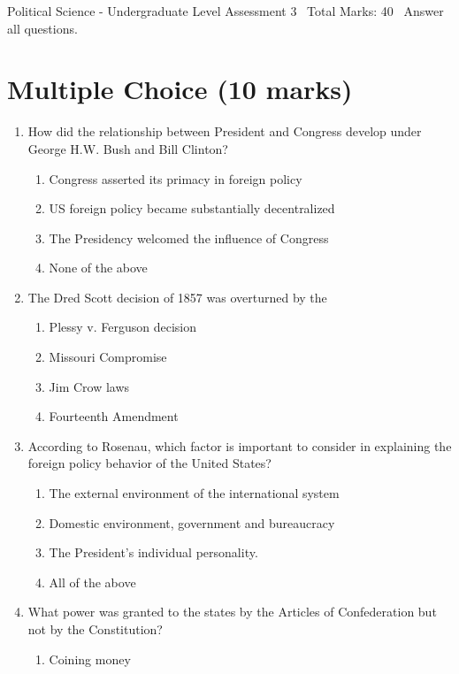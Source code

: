 \documentclass[12pt]{article}
\begin{document}
\begin{center}
Political Science - Undergraduate Level Assessment 3 \
Total Marks: 40 \
Answer all questions.
\end{center}

\section*{Multiple Choice (10 marks)}
\begin{enumerate}[label=\arabic*.]
\item How did the relationship between President and Congress develop under George H.W. Bush and Bill Clinton?
\begin{enumerate}[label=(\alph*)]
    \item Congress asserted its primacy in foreign policy
    \item US foreign policy became substantially decentralized
    \item The Presidency welcomed the influence of Congress
    \item None of the above
\end{enumerate}
\item The Dred Scott decision of 1857 was overturned by the
\begin{enumerate}[label=(\alph*)]
    \item Plessy v. Ferguson decision
    \item Missouri Compromise
    \item Jim Crow laws
    \item Fourteenth Amendment
\end{enumerate}
\item According to Rosenau, which factor is important to consider in explaining the foreign policy behavior of the United States?
\begin{enumerate}[label=(\alph*)]
    \item The external environment of the international system
    \item Domestic environment, government and bureaucracy
    \item The President's individual personality.
    \item All of the above
\end{enumerate}
\item What power was granted to the states by the Articles of Confederation but not by the Constitution?
\begin{enumerate}[label=(\alph*)]
    \item Coining money

\end{enumerate}
\end{enumerate}
\end{document}
